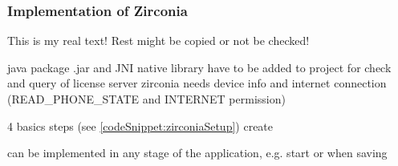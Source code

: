 \subsubsection{Implementation of Zirconia} \label{subsection:license-samsung-implementation}
This is my real text! Rest might be copied or not be checked!

%
java package .jar and JNI native library have to be added to project
for check and query of license server zirconia needs device info and internet connection (READ\_PHONE\_STATE and INTERNET permission)

4 basics steps (see \ref{codeSnippet:zirconiaSetup})
create

can be implemented in any stage of the application, e.g. start or when saving

\cite{samsungZirconia}
%




